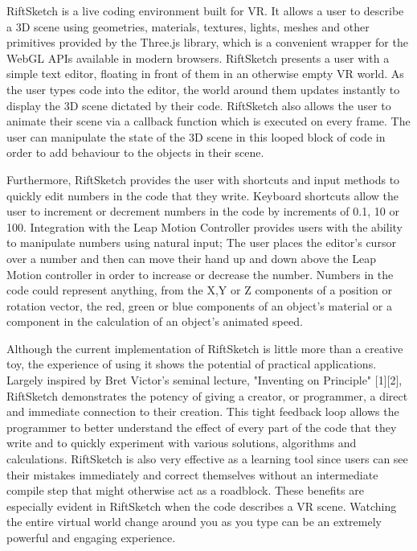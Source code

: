 \documentclass{acm_proc_article-sp}
\begin{document}
RiftSketch is a live coding environment built for VR. It allows a user to describe a 3D scene using geometries, materials, textures, lights, meshes and other primitives provided by the Three.js library, which is a convenient wrapper for the WebGL APIs available in modern browsers. RiftSketch presents a user with a simple text editor, floating in front of them in an otherwise empty VR world. As the user types code into the editor, the world around them updates instantly to display the 3D scene dictated by their code. RiftSketch also allows the user to animate their scene via a callback function which is executed on every frame. The user can manipulate the state of the 3D scene in this looped block of code in order to add behaviour to the objects in their scene.

Furthermore, RiftSketch provides the user with shortcuts and input methods to quickly edit numbers in the code that they write. Keyboard shortcuts allow the user to increment or decrement numbers in the code by increments of 0.1, 10 or 100. Integration with the Leap Motion Controller provides users with the ability to manipulate numbers using natural input; The user places the editor's cursor over a number and then can move their hand up and down above the Leap Motion controller in order to increase or decrease the number. Numbers in the code could represent anything, from the X,Y or Z components of a position or rotation vector, the red, green or blue components of an object's material or a component in the calculation of an object's animated speed.

Although the current implementation of RiftSketch is little more than a creative toy, the experience of using it shows the potential of practical applications. Largely inspired by Bret Victor's seminal lecture, "Inventing on Principle" [1][2], RiftSketch demonstrates the potency of giving a creator, or programmer, a direct and immediate connection to their creation. This tight feedback loop allows the programmer to better understand the effect of every part of the code that they write and to quickly experiment with various solutions, algorithms and calculations. RiftSketch is also very effective as a learning tool since users can see their mistakes immediately and correct themselves without an intermediate compile step that might otherwise act as a roadblock.  These benefits are especially evident in RiftSketch when the code describes a VR scene. Watching the entire virtual world change around you as you type can be an extremely powerful and engaging experience.
\end{document}
